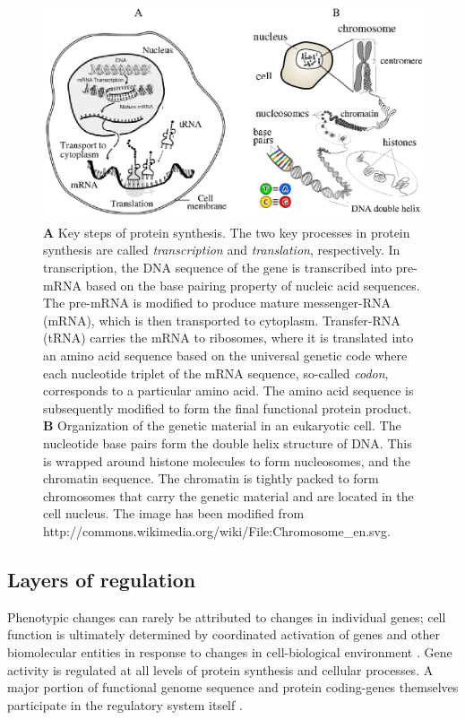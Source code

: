 \begin{figure}[ht]\label{fig:bio}
\centerline{\includegraphics[width=.9\textwidth]{pic/bio.eps}}
\caption{{\bf A} Key steps of protein synthesis. The two key processes
  in protein synthesis are called {\it transcription} and {\it
    translation}, respectively. In transcription, the DNA sequence of
  the gene is transcribed into pre-mRNA based on the base pairing
  property of nucleic acid sequences. The pre-mRNA is modified to
  produce mature messenger-RNA (mRNA), which is then transported to
  cytoplasm. Transfer-RNA (tRNA) carries the mRNA to ribosomes, where
  it is translated into an amino acid sequence based on the universal
  genetic code where each nucleotide triplet of the mRNA sequence,
  so-called \emph{codon}, corresponds to a particular amino acid. The
  amino acid sequence is subsequently modified to form the final
  functional protein product. {\bf B} Organization of the genetic
  material in an eukaryotic cell. The nucleotide base pairs form the
  double helix structure of DNA. This is wrapped around histone
  molecules to form nucleosomes, and the chromatin sequence. The
  chromatin is tightly packed to form chromosomes that carry the
  genetic material and are located in the cell nucleus. The image has
  been modified from
  http://commons.wikimedia.org/wiki/File:Chromosome\_en.svg.}
\end{figure}

\subsection{Layers of regulation}

Phenotypic changes can rarely be attributed to changes in individual
genes; cell function is ultimately determined by coordinated
activation of genes and other biomolecular entities in response to
changes in cell-biological environment \citep{Hartwell99}. Gene
activity is regulated at all levels of protein synthesis and cellular
processes. A major portion of functional genome sequence and protein
coding-genes themselves participate in the regulatory system itself
\citep{Lauffenburger00}.

